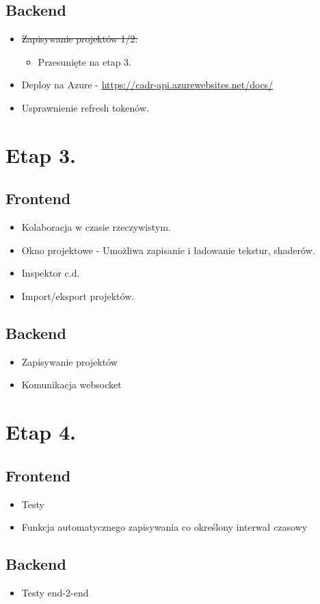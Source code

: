 \documentclass[11pt]{article}
\begin{document}
\subsection{Backend}
\label{sec:orgd6c1898}
\begin{itemize}
\item \sout{Zapisywanie projektów 1/2.}
\begin{itemize}
\item Przesunięte na etap 3.
\end{itemize}
\item Deploy na Azure -  \url{https://cadr-api.azurewebsites.net/docs/}
\item Usprawnienie refresh tokenów.
\end{itemize}
\section{Etap 3.}
\label{sec:org205c4f4}
\subsection{Frontend}
\label{sec:orge14844b}
\begin{itemize}
\item Kolaboracja w czasie rzeczywistym.
\item Okno projektowe - Umożliwa zapisanie i ładowanie tekstur, shaderów.
\item Inspektor c.d.
\item Import/eksport projektów.
\end{itemize}
\subsection{Backend}
\label{sec:orga635970}
\begin{itemize}
\item Zapisywanie projektów
\item Komunikacja websocket
\end{itemize}
\section{Etap 4.}
\label{sec:orgdfb35d3}
\subsection{Frontend}
\label{sec:orge3ac6cc}
\begin{itemize}
\item Testy
\item Funkcja automatycznego zapisywania co określony interwał czasowy
\end{itemize}
\subsection{Backend}
\label{sec:org7faa25f}
\begin{itemize}
\item Testy end-2-end
\end{itemize}
\end{document}
